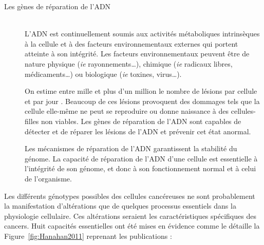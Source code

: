 			\begin{description}
				\item [Les gènes de réparation de l'\acs{ADN}]  \hfill \\
					L'\acs{ADN} est continuellement soumis aux activités métaboliques intrinsèques à la cellule et à des facteurs environnementaux externes qui portent atteinte à son intégrité.
					Les facteurs environnementaux peuvent être de nature physique (\emph{ie} rayonnements\dots), chimique (\emph{ie} radicaux libres, médicaments\dots) ou biologique (\emph{ie} toxines, virus\dots).

					On estime entre mille et plus d'un million le nombre de lésions par cellule et par jour \citep{Ames1993}.
					Beaucoup de ces lésions provoquent des dommages tels que la cellule elle-même ne peut se reproduire ou donne naissance à des cellules-filles non viables.
					Les gènes de réparation de l'\acs{ADN} sont capables de détecter et de réparer les lésions de l'\acs{ADN} et prévenir cet état anormal.

					Les mécanismes de réparation de l'\acs{ADN} garantissent la stabilité du génome.
					La capacité de réparation de l'\acs{ADN} d'une cellule est essentielle à l'intégrité de son génome, et donc à son fonctionnement normal et à celui de l'organisme.
			\end{description}

			Les différents génotypes possibles des cellules cancéreuses ne sont probablement la manifestation d'altérations que de quelques processus essentiels dans la physiologie cellulaire.
			Ces altérations seraient les caractéristiques spécifiques des cancers.
			Huit capacités essentielles ont été mises en évidence comme le détaille la Figure~\ref{fig:Hanahan2011} reprenant les publications \citet{Hanahan2000,Hanahan2011} :

			\begin{sidewaysfigure}
				\begin{center}
					\def\svgwidth{\columnwidth}
					
					\caption{Caractéristiques du Cancer.}
					\label{fig:Hanahan2011}
					\caption*{Figure inspirée de \citeauthor{Hanahan2000,Hanahan2011}.}
				\end{center}
			\end{sidewaysfigure}

